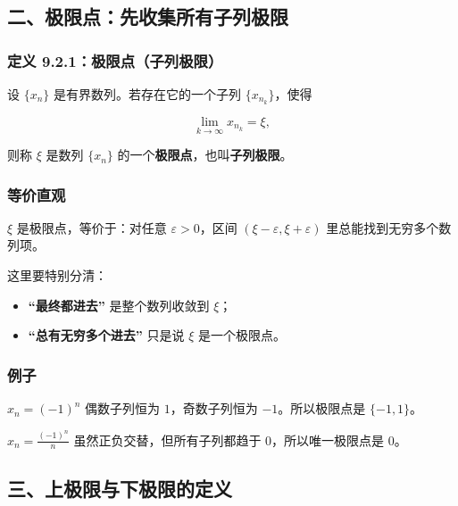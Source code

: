 \subsection*{二、极限点：先收集所有子列极限}

\subsubsection*{定义 9.2.1：极限点（子列极限）}

设 \(\{x_n\}\) 是有界数列。若存在它的一个子列 \(\{x_{n_k}\}\)，使得

\[
      \lim_{k\to\infty}x_{n_k}=\xi,
    \]

则称 \(\xi\) 是数列 \(\{x_n\}\) 的一个\textbf{极限点}，也叫\textbf{子列极限}。

\subsubsection*{等价直观}

\(\xi\) 是极限点，等价于：对任意 \(\varepsilon>0\)，区间 \((\xi-\varepsilon,\xi+\varepsilon)\) 里总能找到无穷多个数列项。

\begin{notebox}
这里要特别分清：
\end{notebox}

\begin{itemize}
 \item \textbf{“最终都进去”} 是整个数列收敛到 \(\xi\)；
 \item \textbf{“总有无穷多个进去”} 只是说 \(\xi\) 是一个极限点。
 \end{itemize}

\subsubsection*{例子}

\begin{conceptbox}
\textbf{\(x_n=(-1)^n\)}
偶数子列恒为 \(1\)，奇数子列恒为 \(-1\)。所以极限点是 \(\{-1,1\}\)。
\end{conceptbox}

\begin{conceptbox}
\textbf{\(x_n=\frac{(-1)^n}{n}\)}
虽然正负交替，但所有子列都趋于 \(0\)，所以唯一极限点是 \(0\)。
\end{conceptbox}

\subsection*{三、上极限与下极限的定义}

